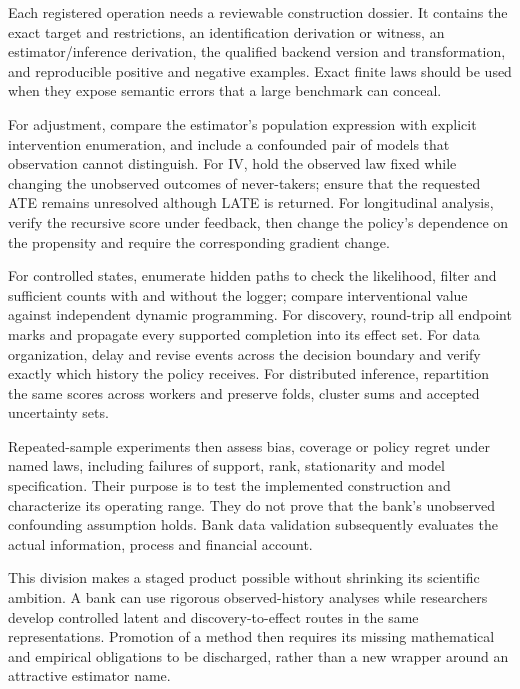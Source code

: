 Each registered operation needs a reviewable construction dossier. It
contains the exact target and restrictions, an identification derivation
or witness, an estimator/inference derivation, the qualified backend
version and transformation, and reproducible positive and negative
examples. Exact finite laws should be used when they expose semantic
errors that a large benchmark can conceal.

For adjustment, compare the estimator's population expression with
explicit intervention enumeration, and include a confounded pair of
models that observation cannot distinguish. For IV, hold the observed
law fixed while changing the unobserved outcomes of never-takers; ensure
that the requested ATE remains unresolved although LATE is returned.
For longitudinal analysis, verify the recursive score under feedback,
then change the policy's dependence on the propensity and require the
corresponding gradient change.

For controlled states, enumerate hidden paths to check the likelihood,
filter and sufficient counts with and without the logger; compare
interventional value against independent dynamic programming. For
discovery, round-trip all endpoint marks and propagate every supported
completion into its effect set. For data organization, delay and revise
events across the decision boundary and verify exactly which history
the policy receives. For distributed inference, repartition the same
scores across workers and preserve folds, cluster sums and accepted
uncertainty sets.

Repeated-sample experiments then assess bias, coverage or policy regret
under named laws, including failures of support, rank, stationarity
and model specification. Their purpose is to test the implemented
construction and characterize its operating range. They do not prove
that the bank's unobserved confounding assumption holds. Bank data
validation subsequently evaluates the actual information, process
and financial account.

This division makes a staged product possible without shrinking its
scientific ambition. A bank can use rigorous observed-history analyses
while researchers develop controlled latent and discovery-to-effect
routes in the same representations. Promotion of a method then requires
its missing mathematical and empirical obligations to be discharged,
rather than a new wrapper around an attractive estimator name.





